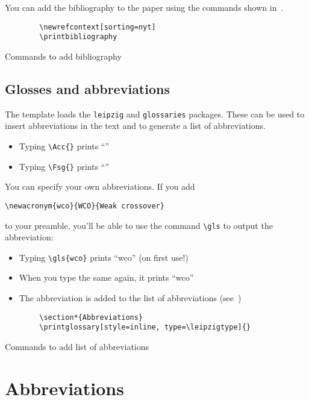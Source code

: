You can add the bibliography to the paper using the commands shown in~.

\begin{listing}[H]
    \begin{verbatim}
        \newrefcontext[sorting=nyt]
        \printbibliography
    \end{verbatim}
    \caption{Commands to add bibliography}\label{lst:bibliography}
\end{listing}

\subsection{Glosses and abbreviations}

The template loads the \texttt{leipzig} and \texttt{glossaries} packages. These can
be used to insert abbreviations in the text and to generate a list of abbreviations.

\begin{itemize}
    \item Typing \verb+\Acc{}+ prints \enquote{\Acc}
    \item Typing \verb+\Fsg{}+ prints \enquote{\Fsg}
\end{itemize}

You can specify your own abbreviations. If you add

\begin{verbatim}
\newacronym{wco}{WCO}{Weak crossover}
\end{verbatim}

to your preamble, you'll be able to use the command \verb+\gls+ to output the
abbreviation:

\begin{itemize}
    \item Typing \verb+\gls{wco}+ prints \enquote{\gls{wco}} (on first use!)
    \item When you type the same again, it prints \enquote{\gls{wco}}
    \item The abbreviation is added to the list of abbreviations
    (see~)
\end{itemize}

\begin{listing}[H]
    \begin{verbatim}
        \section*{Abbreviations}
        \printglossary[style=inline, type=\leipzigtype]{}
    \end{verbatim}
    \caption{Commands to add list of abbreviations}\label{lst:abbreviations}
\end{listing}

\section*{Abbreviations}
\printglossary[style=inline, type=\leipzigtype]{}

\newrefcontext[sorting=nyt]
\printbibliography

%



